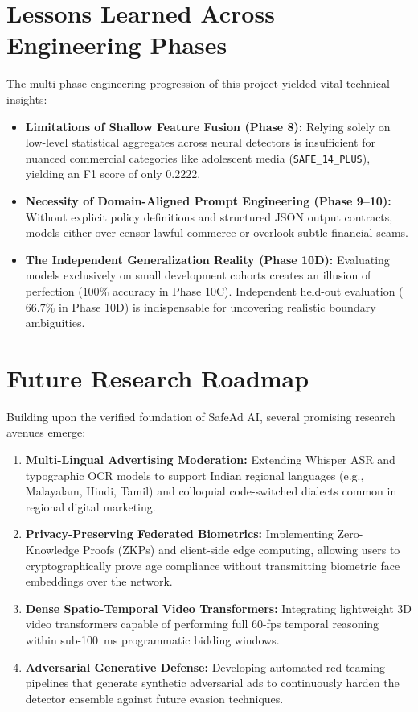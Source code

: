 \documentclass[12pt,a4paper]{report}
\begin{document}
\section{Lessons Learned Across Engineering Phases}
The multi-phase engineering progression of this project yielded vital technical insights:
\begin{itemize}
    \item \textbf{Limitations of Shallow Feature Fusion (Phase 8):} Relying solely on low-level statistical aggregates across neural detectors is insufficient for nuanced commercial categories like adolescent media (\texttt{SAFE\_14\_PLUS}), yielding an F1 score of only $0.2222$.
    \item \textbf{Necessity of Domain-Aligned Prompt Engineering (Phase 9--10):} Without explicit policy definitions and structured JSON output contracts, models either over-censor lawful commerce or overlook subtle financial scams.
    \item \textbf{The Independent Generalization Reality (Phase 10D):} Evaluating models exclusively on small development cohorts creates an illusion of perfection ($100\%$ accuracy in Phase 10C). Independent held-out evaluation ($66.7\%$ in Phase 10D) is indispensable for uncovering realistic boundary ambiguities.
\end{itemize}

\section{Future Research Roadmap}
Building upon the verified foundation of SafeAd AI, several promising research avenues emerge:
\begin{enumerate}
    \item \textbf{Multi-Lingual Advertising Moderation:} Extending Whisper ASR and typographic OCR models to support Indian regional languages (e.g., Malayalam, Hindi, Tamil) and colloquial code-switched dialects common in regional digital marketing.
    \item \textbf{Privacy-Preserving Federated Biometrics:} Implementing Zero-Knowledge Proofs (ZKPs) and client-side edge computing, allowing users to cryptographically prove age compliance without transmitting biometric face embeddings over the network.
    \item \textbf{Dense Spatio-Temporal Video Transformers:} Integrating lightweight 3D video transformers capable of performing full 60-fps temporal reasoning within sub-100~ms programmatic bidding windows.
    \item \textbf{Adversarial Generative Defense:} Developing automated red-teaming pipelines that generate synthetic adversarial ads to continuously harden the detector ensemble against future evasion techniques.
\end{enumerate}
\end{document}
